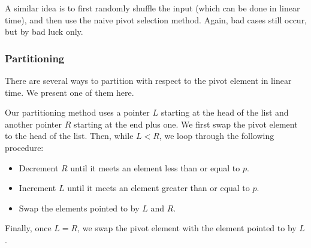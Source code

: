 A similar idea is to first randomly shuffle the input (which can be done in 
linear time), and then use the naive pivot selection method. Again, bad cases 
still occur, but by bad luck only.

\subsubsection*{Partitioning}

There are several ways to partition with respect to the pivot element in linear 
time. We present one of them here. 

Our partitioning method uses a pointer $L$ starting at the head of the list
and another pointer $R$ starting at the end plus one. We first swap the pivot element to
the head of the list. Then, while $L < R$, we loop through the following procedure:

\begin{itemize}
\item Decrement $R$ until it meets an element less than or equal to $p$.
\item Increment $L$ until it meets an element greater than or equal to $p$.
\item Swap the elements pointed to by $L$ and $R$.
\end{itemize}
Finally, once $L = R$, we swap the pivot element with the element
pointed to by $L$.

